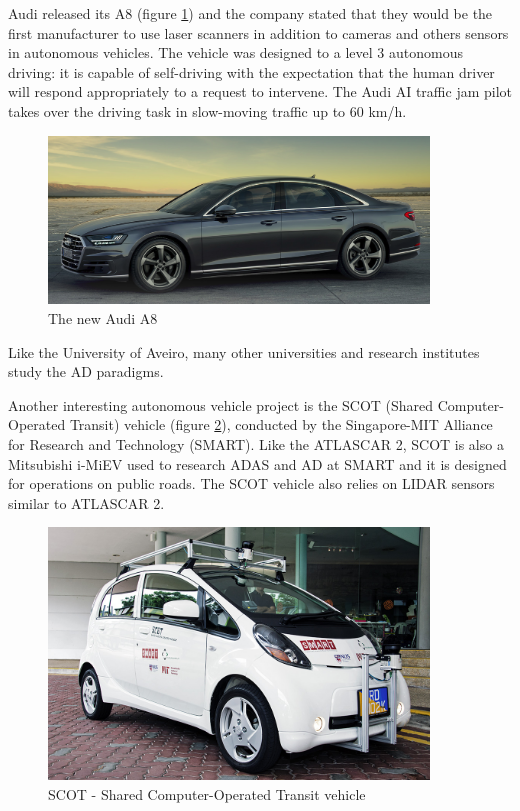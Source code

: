 Audi released its A8 (figure \ref{fig:audi}) and the company stated that they would be the first manufacturer to use laser scanners in addition to cameras and others sensors in autonomous vehicles. The vehicle was designed to a level 3 autonomous driving: it is capable of self-driving with the expectation that the human driver will respond appropriately to a request to intervene. The Audi AI traffic jam pilot takes over the driving task in slow-moving traffic up to 60 km/h. \cite{AudiMediaCenter}

\begin{figure}[htp]
	
	\centering
	\includegraphics[width=0.9\textwidth]{capstate/imgs/audi}
	
	\caption{The new Audi A8}
	\label{fig:audi}
	
\end{figure}

Like the University of Aveiro, many other universities and research institutes study the AD paradigms.

Another interesting autonomous vehicle project is the SCOT (Shared Computer-Operated Transit) vehicle (figure \ref{fig:scot}), conducted by the Singapore-MIT Alliance for Research and Technology (SMART). \cite{Singapore-MITAllianceforResearchandTechnology} Like the ATLASCAR 2, SCOT is also a Mitsubishi i-MiEV used to research ADAS and AD at SMART and it is designed for operations on public roads. The SCOT vehicle also relies on LIDAR sensors similar to ATLASCAR 2. \cite{Teo}

\begin{figure}[htp]
	
	\centering
	\includegraphics[width=0.9\textwidth]{capstate/imgs/scot}
	
	\caption{SCOT - Shared Computer-Operated Transit vehicle}
	\label{fig:scot}
	
\end{figure}


